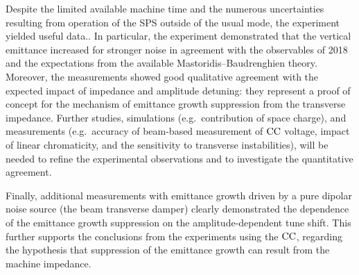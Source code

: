Despite the limited available machine time and the numerous uncertainties resulting from operation of the SPS outside of the usual mode, the experiment yielded useful data.. In particular, the experiment demonstrated that the vertical emittance increased for stronger noise in agreement with the observables of 2018 and the expectations from the available Mastoridis--Baudrenghien theory. Moreover, the measurements showed good qualitative agreement with the expected impact of impedance and amplitude detuning: they represent a proof of concept for the mechanism of emittance growth suppression from the transverse impedance. Further studies, simulations (e.g.~contribution of space charge), and measurements (e.g.~accuracy of beam-based measurement of ${\mathrm{CC}}$ voltage, impact of linear chromaticity, and the sensitivity to transverse instabilities), will be needed to refine the experimental observations and to investigate the quantitative agreement. 

Finally, additional measurements with emittance growth driven by a pure dipolar noise source (the beam transverse damper) clearly demonstrated the dependence of the emittance growth suppression on the amplitude-dependent tune shift.  This further supports the conclusions from the experiments using the ${\mathrm{CC}}$, regarding the hypothesis that suppression of the emittance growth can result from the machine impedance.






